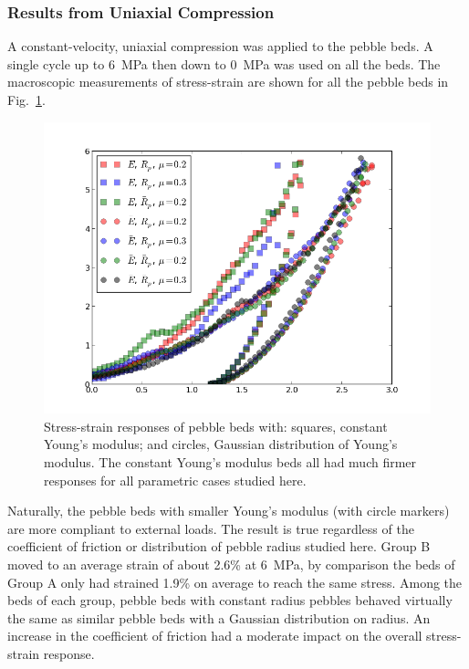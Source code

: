 \subsubsection{Results from Uniaxial Compression}


A constant-velocity, uniaxial compression was applied to the pebble beds. A single cycle up to \SI{6}{\mega\pascal} then down to \SI{0}{\mega\pascal} was used on all the beds. The macroscopic measurements of stress-strain are shown for all the pebble beds in Fig.~\ref{fig:stress-strain}.

\begin{figure}[t]
  \centering
  \includegraphics[width=\singleimagewidth]{chapters/figures/stress-strain}
  \caption{Stress-strain responses of pebble beds with: squares, constant Young's modulus; and circles, Gaussian distribution of Young's modulus. The constant Young's modulus beds all had much firmer responses for all parametric cases studied here.}\label{fig:stress-strain}
\end{figure}

Naturally, the pebble beds with smaller Young’s modulus (with circle markers) are more compliant to external loads. The result is true regardless of the coefficient of friction or distribution of pebble radius studied here. Group B moved to an average strain of about 2.6\% at \SI{6}{\mega\pascal}, by comparison the beds of Group A only had strained 1.9\% on average to reach the same stress. Among the beds of each group, pebble beds with constant radius pebbles behaved virtually the same as similar pebble beds with a Gaussian distribution on radius. An increase in the coefficient of friction had a moderate impact on the overall stress-strain response. 


